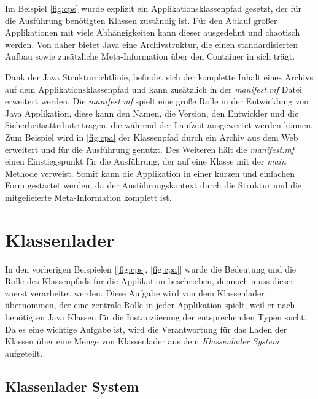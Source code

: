  Im Beispiel \ref{fig:cps} wurde explizit ein Applikationsklassenpfad gesetzt, der für die Ausführung benötigten Klassen zuständig ist. Für den Ablauf großer Applikationen mit viele Abhängigkeiten kann dieser ausgedehnt und chaotisch werden. Von daher bietet Java eine Archivstruktur, die einen standardisierten Aufbau sowie zusätzliche Meta-Information über den Container in sich trägt. 
  
  Dank der Java Strukturrichtlinie, befindet sich der komplette Inhalt eines Archivs auf dem Applikationsklassenpfad und kann zusätzlich in der \textit{manifest.mf} Datei erweitert werden. Die \textit{manifest.mf} spielt eine große Rolle in der Entwicklung von Java Applikation, diese kann den Namen, die Version, den Entwickler und die Sicherheitsattribute tragen, die während der Laufzeit ausgewertet werden können. Zum Beispiel wird in \ref{fig:cpa} der Klassenpfad durch ein Archiv aus dem Web erweitert und für die Ausführung genutzt. Des Weiteren hält die \textit{manifest.mf} einen Einstiegspunkt für die Ausführung, der auf eine Klasse mit der \textit{main} Methode verweist.\newline
  Somit kann die Applikation in einer kurzen und einfachen Form gestartet werden, da der Ausführungskontext durch die Struktur und die mitgelieferte Meta-Information komplett ist. \cite{classLoadingOracle}


\section{Klassenlader}\label{sec:cl}

  In den vorherigen Beispielen [\ref{fig:cps}, \ref{fig:cpa}] wurde die Bedeutung und die Rolle des Klassenpfads für die Applikation beschrieben, dennoch muss dieser zuerst verarbeitet werden. Diese Aufgabe wird von dem Klassenlader übernommen, der eine zentrale Rolle in jeder Applikation spielt, weil er nach benötigten Java Klassen für die Instanziierung der entsprechenden Typen sucht. Da es eine wichtige Aufgabe ist, wird die Verantwortung für das Laden der Klassen über eine Menge von Klassenlader aus dem \textit{Klassenlader System} aufgeteilt. 


  \subsection{Klassenlader System} \label{sec:cls}

